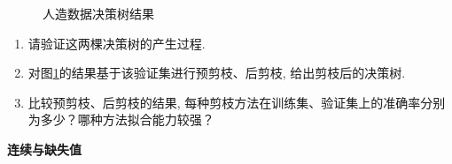 \documentclass[answers]{exam}  %
\begin{document}
\begin{questions}
\begin{figure}[ht]
    \caption{人造数据决策树结果}\label{ch4_fig:decision_tree_1}
  \end{figure}
  \begin{enumerate}
    \item
          请验证这两棵决策树的产生过程.
    \item
          对图\ref{ch4_fig:decision_tree_1}的结果基于该验证集进行预剪枝、后剪枝, 给出剪枝后的决策树.
    \item
          比较预剪枝、后剪枝的结果, 每种剪枝方法在训练集、验证集上的准确率分别为多少？哪种方法拟合能力较强？
  \end{enumerate}

  \begin{solution}
  \end{solution}

  \question [20] \textbf{连续与缺失值}




\end{questions}
\end{document}
